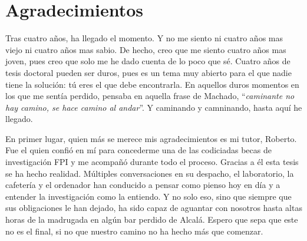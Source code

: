 %
%
%
% 
%
%
%
%

\thispagestyle{empty}

\chapter*{Agradecimientos}
\label{ch:agradecimientos}


Tras cuatro años, ha llegado el momento.
Y no me siento ni cuatro años mas viejo ni cuatro años mas sabio.
De hecho, creo que me siento cuatro años mas joven, pues creo que solo me he dado cuenta de lo poco que sé.
Cuatro años de tesis doctoral pueden ser duros, pues es un tema muy abierto para el que nadie tiene la solución: tú eres el que debe encontrarla.
En aquellos duros momentos en los que me sentía perdido, pensaba en aquella frase de Machado, ``\textit{caminante no hay camino, se hace camino al andar}''.
Y caminando y camninando, hasta aquí he llegado.

En primer lugar, quien más se merece mis agradecimientos es mi tutor, Roberto.
Fue el quien confió en mí para concederme una de las codiciadas becas de investigación FPI y me acompañó durante todo el proceso.
Gracias a él esta tesis se ha hecho realidad.
Múltiples conversaciones en su despacho, el laboratorio, la cafetería y el ordenador han conducido a pensar como pienso hoy en día y a entender la investigación como la entiendo.
Y no solo eso, sino que siempre que sus obligaciones le han dejado, ha sido capaz de aguantar con nosotros hasta altas horas de la madrugada en algún bar perdido de Alcalá.
Espero que sepa que este no es el final, si no que nuestro camino no ha hecho más que comenzar.

